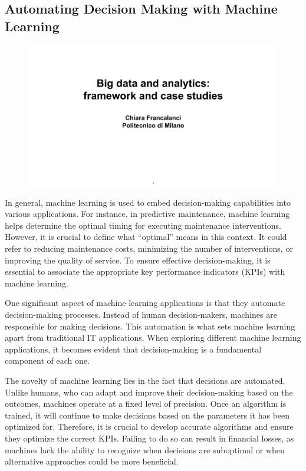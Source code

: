 \subsection{Automating Decision Making with Machine
    Learning}\label{automating-decision-making-with-machine-learning}


\begin{figure}[!h]
    \centering
    \includegraphics[page=20, trim = 1.5cm 2.5cm 2.5cm 2.9cm, clip, width=\textwidth]{images/06 - BIG_DATA.pdf}
\end{figure}


In general, machine learning is used to embed decision-making
capabilities into various applications. For instance, in predictive
maintenance, machine learning helps determine the optimal timing for
executing maintenance interventions. However, it is crucial to define
what ``optimal'' means in this context. It could refer to reducing
maintenance costs, minimizing the number of interventions, or improving
the quality of service. To ensure effective decision-making, it is
essential to associate the appropriate key performance indicators (KPIs)
with machine learning.

One significant aspect of machine learning applications is that they
automate decision-making processes. Instead of human decision-makers,
machines are responsible for making decisions. This automation is what
sets machine learning apart from traditional IT applications. When
exploring different machine learning applications, it becomes evident
that decision-making is a fundamental component of each one.

The novelty of machine learning lies in the fact that decisions are
automated. Unlike humans, who can adapt and improve their
decision-making based on the outcomes, machines operate at a fixed level
of precision. Once an algorithm is trained, it will continue to make
decisions based on the parameters it has been optimized for. Therefore,
it is crucial to develop accurate algorithms and ensure they optimize
the correct KPIs. Failing to do so can result in financial losses, as
machines lack the ability to recognize when decisions are suboptimal or
when alternative approaches could be more beneficial.


